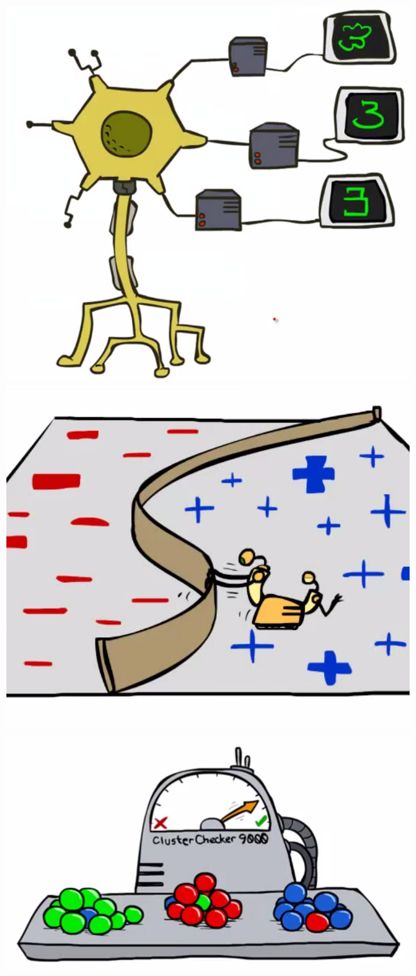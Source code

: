 \documentclass[twocolumn]{article}
\begin{document}
{\includegraphics[scale=0.5]{snapshot153}\\
\includegraphics[scale=0.5]{snapshot154}\\
\includegraphics[scale=0.5]{snapshot155}\\
}
\end{document}
